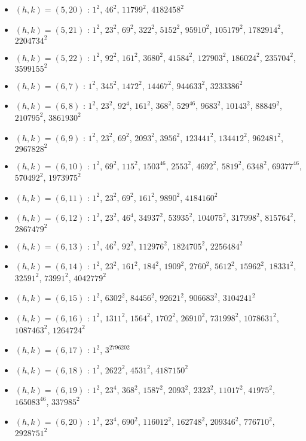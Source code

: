 \begin{itemize}
\item $(h,k)=(5,20)$ : $1^{2}$, $46^{2}$, $11799^{2}$, $4182458^{2}$
\item $(h,k)=(5,21)$ : $1^{2}$, $23^{2}$, $69^{2}$, $322^{2}$, $5152^{2}$, $95910^{2}$, $105179^{2}$, $1782914^{2}$, $2204734^{2}$
\item $(h,k)=(5,22)$ : $1^{2}$, $92^{2}$, $161^{2}$, $3680^{2}$, $41584^{2}$, $127903^{2}$, $186024^{2}$, $235704^{2}$, $3599155^{2}$
\item $(h,k)=(6,7)$ : $1^{2}$, $345^{2}$, $1472^{2}$, $14467^{2}$, $944633^{2}$, $3233386^{2}$
\item $(h,k)=(6,8)$ : $1^{2}$, $23^{2}$, $92^{4}$, $161^{2}$, $368^{2}$, $529^{46}$, $9683^{2}$, $10143^{2}$, $88849^{2}$, $210795^{2}$, $3861930^{2}$
\item $(h,k)=(6,9)$ : $1^{2}$, $23^{2}$, $69^{2}$, $2093^{2}$, $3956^{2}$, $123441^{2}$, $134412^{2}$, $962481^{2}$, $2967828^{2}$
\item $(h,k)=(6,10)$ : $1^{2}$, $69^{2}$, $115^{2}$, $1503^{46}$, $2553^{2}$, $4692^{2}$, $5819^{2}$, $6348^{2}$, $69377^{46}$, $570492^{2}$, $1973975^{2}$
\item $(h,k)=(6,11)$ : $1^{2}$, $23^{2}$, $69^{2}$, $161^{2}$, $9890^{2}$, $4184160^{2}$
\item $(h,k)=(6,12)$ : $1^{2}$, $23^{2}$, $46^{4}$, $34937^{2}$, $53935^{2}$, $104075^{2}$, $317998^{2}$, $815764^{2}$, $2867479^{2}$
\item $(h,k)=(6,13)$ : $1^{2}$, $46^{2}$, $92^{2}$, $112976^{2}$, $1824705^{2}$, $2256484^{2}$
\item $(h,k)=(6,14)$ : $1^{2}$, $23^{2}$, $161^{2}$, $184^{2}$, $1909^{2}$, $2760^{2}$, $5612^{2}$, $15962^{2}$, $18331^{2}$, $32591^{2}$, $73991^{2}$, $4042779^{2}$
\item $(h,k)=(6,15)$ : $1^{2}$, $6302^{2}$, $84456^{2}$, $92621^{2}$, $906683^{2}$, $3104241^{2}$
\item $(h,k)=(6,16)$ : $1^{2}$, $1311^{2}$, $1564^{2}$, $1702^{2}$, $26910^{2}$, $731998^{2}$, $1078631^{2}$, $1087463^{2}$, $1264724^{2}$
\item $(h,k)=(6,17)$ : $1^{2}$, $3^{2796202}$
\item $(h,k)=(6,18)$ : $1^{2}$, $2622^{2}$, $4531^{2}$, $4187150^{2}$
\item $(h,k)=(6,19)$ : $1^{2}$, $23^{4}$, $368^{2}$, $1587^{2}$, $2093^{2}$, $2323^{2}$, $11017^{2}$, $41975^{2}$, $165083^{46}$, $337985^{2}$
\item $(h,k)=(6,20)$ : $1^{2}$, $23^{4}$, $690^{2}$, $116012^{2}$, $162748^{2}$, $209346^{2}$, $776710^{2}$, $2928751^{2}$

\end{itemize}
